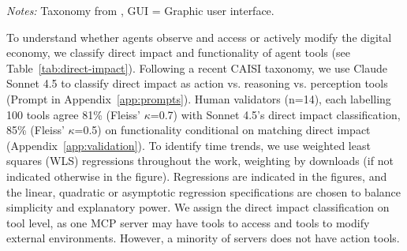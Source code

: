 \documentclass[manuscript,screen,nonacm,oneside]{acmart}
\begin{document}
\begin{table}[htbp]
\centering
\caption{Direct impact and functionality of Agent tools.}
\small
{}
\textit{Notes:} Taxonomy from \citet{CAISI2025}, GUI = Graphic user interface.
\label{tab:direct-impact}
\end{table}
To understand whether agents observe and access or actively modify the digital economy, we classify direct impact and functionality of agent tools (see Table~\ref{tab:direct-impact}). Following a recent CAISI \citep{CAISI2025} taxonomy, we use Claude Sonnet 4.5 to classify direct impact as action vs. reasoning vs. perception tools (Prompt in Appendix~\ref{app:prompts}). Human validators (n=14), each labelling 100 tools agree 81\% (Fleiss' $\kappa$=0.7) with Sonnet 4.5's direct impact classification, 85\% (Fleiss' $\kappa$=0.5) on functionality conditional on matching direct impact (Appendix~\ref{app:validation}). To identify time trends, we use weighted least squares (WLS) regressions throughout the work, weighting by downloads (if not indicated otherwise in the figure). Regressions are indicated in the figures, and the linear, quadratic or asymptotic regression specifications are chosen to balance simplicity and explanatory power. We assign the direct impact classification on tool level, as one MCP server may have tools to access and tools to modify external environments. However, a minority of servers does not have action tools. 
\end{document}
